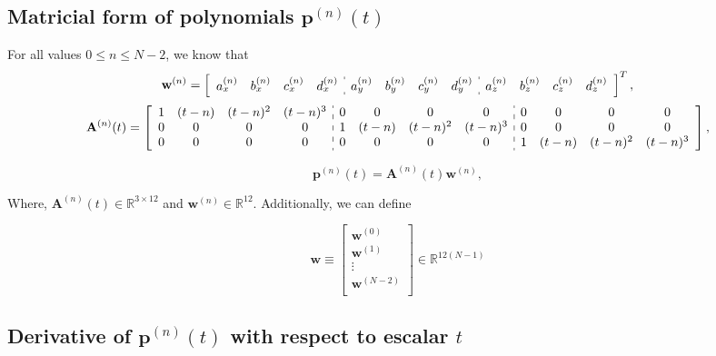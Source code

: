 \subsection{Matricial form of polynomials $\mathbf{p}^{(n)}(t)$}
For all values $0\leq n \leq N-2$, we know that
\begin{equation}
\mathbf{w}^{(n)}=
\left[
\begin{array}{cccc:cccc:cccc}
a_{x}^{(n)} & b_{x}^{(n)} & c_{x}^{(n)} & d_{x}^{(n)} & 
a_{y}^{(n)} & b_{y}^{(n)} & c_{y}^{(n)} & d_{y}^{(n)} & 
a_{z}^{(n)} & b_{z}^{(n)} & c_{z}^{(n)} & d_{z}^{(n)}
\end{array}
\right]^{T},
\end{equation}
\small
\begin{equation}\label{eq:Ant}
\mathbf{A}^{(n)}(t)
=
\left[
\begin{array}{cccc:cccc:cccc}
1 & (t-n) & (t-n)^{2} & (t-n)^{3} &
0 & 0 & 0 & 0 &
0 & 0 & 0 & 0 \\
0 & 0 & 0 & 0 &
1 & (t-n) & (t-n)^{2} & (t-n)^{3} &
0 & 0 & 0 & 0 \\
0 & 0 & 0 & 0 &
0 & 0 & 0 & 0 &
1 & (t-n) & (t-n)^{2} & (t-n)^{3} 
\end{array}
\right],
\end{equation}
\normalsize

\begin{equation}\label{eq:primeder0}
\mathbf{p}^{(n)}(t)=
\mathbf{A}^{(n)}(t) \mathbf{w}^{(n)},
\end{equation}

Where, $\mathbf{A}^{(n)}(t) \in \mathbb{R}^{3 \times 12}$ and $\mathbf{w}^{(n)} \in \mathbb{R}^{12}$.
Additionally, we can define

\begin{equation}\label{eq:wvector}
\mathbf{w}
\equiv
\begin{bmatrix}
\mathbf{w}^{(0)}\\
\mathbf{w}^{(1)}\\
\vdots\\
\mathbf{w}^{(N-2)}\\
\end{bmatrix}
\in \mathbb{R}^{12(N-1)}
\end{equation}

\subsection{Derivative of $\mathbf{p}^{(n)}(t)$ with respect to escalar $t$}

